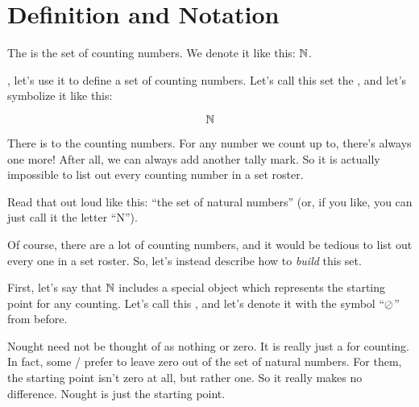 \documentclass[../../../main.tex]{subfiles}
\begin{document}
\section{Definition and Notation}

\begin{terminology}
  The  is the set of counting numbers. We denote it like this: $\Nats/$.
\end{terminology}

, let's use it to define a set of counting numbers. Let's call this set the , and let's symbolize it like this:

\begin{equation*}
  \Nats/
\end{equation*}

\begin{aside}
  \begin{remark}
    There is  to the counting numbers. For any number we count up to, there's always one more! After all, we can always add another tally mark. So it is actually impossible to list out every counting number in a set roster.
  \end{remark}
\end{aside}

Read that out loud like this: ``the set of natural numbers'' (or, if you like, you can just call it the letter ``N'').

Of course, there are a lot of counting numbers, and it would be tedious to list out every one in a set roster. So, let's instead describe how to \emph{build} this set. 

First, let's say that $\Nats/$ includes a special object which represents the starting point for any counting. Let's call this , and let's denote it with the symbol ``$\nought/$'' from before. 

\begin{aside}
  \begin{remark}
    Nought need not be thought of as nothing or zero. It is really just a  for counting. In fact, some \mathers/ prefer to leave zero out of the set of natural numbers. For them, the starting point isn't zero at all, but rather one. So it really makes no difference. Nought is just the starting point.
  \end{remark}
\end{aside}
\end{document}
